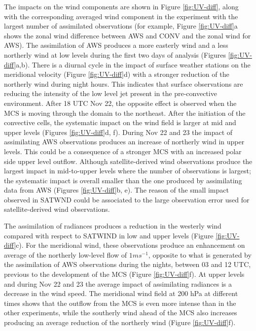 \documentclass[preprint, 3p, authoryear,review, 12pt]{elsarticle} %
\begin{document}
The impacts on the wind components are shown in Figure \ref{fig:UV-diff}, along with the corresponding averaged wind component in the experiment with the largest number of assimilated observations (for example, Figure \ref{fig:UV-diff}a shows the zonal wind difference between AWS and CONV and the zonal wind for AWS). The assimilation of AWS produces a more easterly wind and a less northerly wind at low levels during the first two days of analysis (Figures \ref{fig:UV-diff}a,b). There is a diurnal cycle in the impact of surface weather stations on the meridional velocity (Figure \ref{fig:UV-diff}d) with a stronger reduction of the northerly wind during night hours. This indicates that surface observations are reducing the intensity of the low level jet present in the pre-convective environment. After 18 UTC Nov 22, the opposite effect is observed when the MCS is moving through the domain to the northeast. After the initiation of the convective cells, the systematic impact on the wind field is larger at mid and upper levels (Figures \ref{fig:UV-diff}d, f). During Nov 22 and 23 the impact of assimilating AWS observations produces an increase of northerly wind in upper levels. This could be a consequence of a stronger MCS with an increased polar side upper level outflow. Although satellite-derived wind observations produce the largest impact in mid-to-upper levels where the number of observations is largest; the systematic impact is overall smaller than the one produced by assimilating data from AWS (Figures \ref{fig:UV-diff}b, e). The reason of the small impact observed in SATWND could be associated to the large observation error used for satellite-derived wind observations.

The assimilation of radiances produces a reduction in the westerly wind compared with respect to SATWIND in low and upper levels (Figure \ref{fig:UV-diff}c). For the meridional wind, these observations produce an enhancement on average of the northerly low-level flow of \(1 ms^{-1}\), opposite to what is generated by the assimilation of AWS observations during the nights, between 03 and 12 UTC, previous to the development of the MCS (Figure \ref{fig:UV-diff}f). At upper levels and during Nov 22 and 23 the average impact of assimilating radiances is a decrease in the wind speed. The meridional wind field at 200 hPa at different times shows that the outflow from the MCS is even more intense than in the other experiments, while the southerly wind ahead of the MCS also increases producing an average reduction of the northerly wind (Figure \ref{fig:UV-diff}f).
\end{document}
